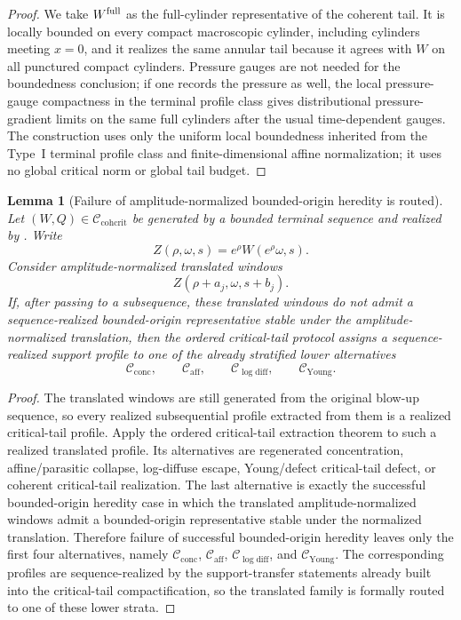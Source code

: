 \documentclass[11pt]{amsart}
\numberwithin{equation}{section}
\theoremstyle{plain}
\newtheorem{lemma}[lemma]{Lemma}
\theoremstyle{definition}
\theoremstyle{remark}
\newcommand{\Cactive}{\mathcal C_{\mathrm{conc}}}
\newcommand{\Caff}{\mathcal C_{\mathrm{aff}}}
\newcommand{\Ccohcrit}{\mathcal C_{\mathrm{cohcrit}}}
\newcommand{\Cyoung}{\mathcal C_{\mathrm{Young}}}
\newcommand{\Clogdiff}{\mathcal C_{\log\mathrm{diff}}}
\begin{document}
\begin{proof}
We take \(W^{\rm full}\) as the full-cylinder representative of the coherent
tail.  It is locally bounded on every compact macroscopic cylinder, including
cylinders meeting \(x=0\), and it realizes the same annular tail because it
agrees with \(W\) on all punctured compact cylinders.  Pressure gauges are not
needed for the boundedness conclusion; if one records the pressure as well, the
local pressure-gauge compactness in the terminal profile class gives
distributional pressure-gradient limits on the same full cylinders after the
usual time-dependent gauges.  The construction uses only the uniform local
boundedness inherited from the Type~I terminal profile class and finite-dimensional
affine normalization; it uses no global critical norm or global tail budget.
\end{proof}

\begin{lemma}[Failure of amplitude-normalized bounded-origin heredity is routed]
\label{lem:amplitude-normalized-heredity-failure-routing}
Let \((W,Q)\in\Ccohcrit\) be generated by a bounded terminal sequence and
realized by .  Write
\[
   Z(\rho,\omega,s)=e^\rho W(e^\rho\omega,s).
\]
Consider amplitude-normalized translated windows
\[
   Z(\rho+a_j,\omega,s+b_j).
\]
If, after passing to a subsequence, these translated windows do not admit a
sequence-realized bounded-origin representative stable under the
amplitude-normalized translation, then the ordered critical-tail protocol
assigns a sequence-realized support profile to one of the already stratified
lower alternatives
\[
   \Cactive,\qquad \Caff,\qquad \Clogdiff,\qquad \Cyoung.
\]
\end{lemma}

\begin{proof}
The translated windows are still generated from the original blow-up sequence,
so every realized subsequential profile extracted from them is a realized
critical-tail profile.  Apply the ordered critical-tail extraction theorem
 to such a realized translated
profile.  Its alternatives are regenerated concentration, affine/parasitic
collapse, log-diffuse escape, Young/defect critical-tail defect, or coherent
critical-tail realization.  The last alternative is exactly the successful
bounded-origin heredity case in which the translated amplitude-normalized
windows admit a bounded-origin representative stable under the normalized
translation.  Therefore failure of successful bounded-origin heredity leaves
only the first four alternatives, namely
\(\Cactive\), \(\Caff\), \(\Clogdiff\), and \(\Cyoung\).  The corresponding
profiles are sequence-realized by the support-transfer statements already built
into the critical-tail compactification, so the translated family is formally
routed to one of these lower strata.
\end{proof}
\end{document}

